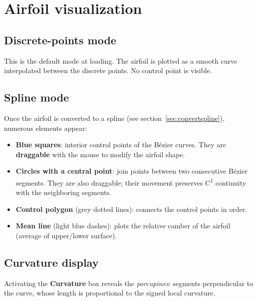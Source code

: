 \section{Airfoil visualization}

\subsection{Discrete-points mode}

This is the default mode at loading. The airfoil is plotted as a
smooth curve interpolated between the discrete points. No control
point is visible.

\subsection{Spline mode}

Once the airfoil is converted to a spline (see
section~\ref{sec:convertspline}), numerous elements appear:


\begin{itemize}
    \item \textbf{Blue squares}: interior control points of the
        Bézier curves. They are \textbf{draggable} with the mouse to
        modify the airfoil shape.
    \item \textbf{Circles with a central point}: join points between
        two consecutive Bézier segments. They are also draggable;
        their movement preserves C\textsuperscript{1} continuity with
        the neighboring segments.
    \item \textbf{Control polygon} (grey dotted lines): connects the
        control points in order.
    \item \textbf{Mean line} (light blue dashes): plots the relative
        camber of the airfoil (average of upper/lower surface).
\end{itemize}

\subsection{Curvature display}

Activating the \textbf{Curvature} box reveals the
\emph{porcupines}: segments perpendicular to the curve, whose length
is proportional to the signed local curvature.


